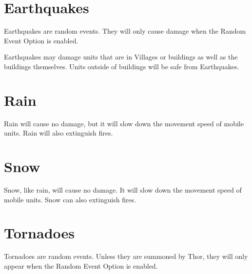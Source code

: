 \section{Earthquakes}

Earthquakes are random events. They will only cause damage when the Random Event Option is enabled.

Earthquakes may damage units that are in Villages or buildings as well as the buildings themselves. Units outside of buildings will be safe from Earthquakes.
\section{Rain}

Rain will cause no damage, but it will slow down the movement speed of mobile units. Rain will also extinguish fires.

\section{Snow}

Snow, like rain, will cause no damage. It will slow down the movement speed of mobile units. Snow can also extinguish fires.

\section{Tornadoes}

Tornadoes are random events. Unless they are summoned by Thor, they will only appear when the Random Event Option is enabled.